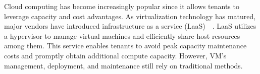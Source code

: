 











Cloud computing has become increasingly popular since it allows tenants to leverage capacity and cost advantages. As virtualization technology has matured, major vendors have introduced infrastructure as a 
service (LaaS)~\cite*{8031522}~\cite*{10.1145/2767181}. LaaS utilizes a hypervisor to manage 
virtual machines and efficiently share host resources among them. This service enables tenants to avoid peak capacity maintenance costs and promptly obtain additional compute capacity. However, VM's management, deployment, and maintenance still rely on traditional methods.
 
